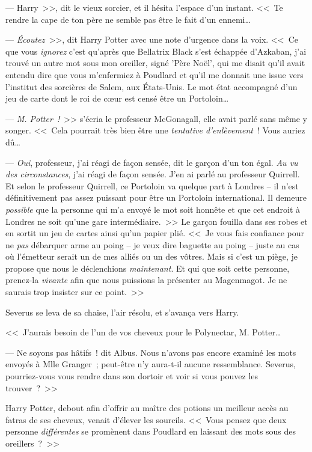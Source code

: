 --- Harry~>>, dit le vieux sorcier, et il hésita l'espace d'un instant. <<~Te rendre la cape de ton père ne semble pas être le fait d'un ennemi…

--- \emph{Écoutez}~>>, dit Harry Potter avec une note d'urgence dans la voix. <<~Ce que vous \emph{ignorez} c'est qu'après que Bellatrix Black s'est échappée d'Azkaban, j'ai trouvé un autre mot sous mon oreiller, signé 'Père Noël', qui me disait qu'il avait entendu dire que vous m'enfermiez à Poudlard et qu'il me donnait une issue vers l'institut des sorcières de Salem, aux États-Unis. Le mot état accompagné d'un jeu de carte dont le roi de cœur est censé être un Portoloin…

--- \emph{M. Potter~!}~>> s'écria le professeur McGonagall, elle avait parlé sans même y songer. <<~Cela pourrait très bien être une \emph{tentative d'enlèvement}~! Vous auriez dû…

--- \emph{Oui}, professeur, j'ai réagi de façon sensée, dit le garçon d'un ton égal. \emph{Au vu des circonstances}, j'ai réagi de façon sensée. J'en ai parlé au professeur Quirrell. Et selon le professeur Quirrell, ce Portoloin va quelque part à Londres -- il n'est définitivement pas assez puissant pour être un Portoloin international. Il demeure \emph{possible} que la personne qui m'a envoyé le mot soit honnête et que cet endroit à Londres ne soit qu'une gare intermédiaire.~>> Le garçon fouilla dans ses robes et en sortit un jeu de cartes ainsi qu'un papier plié. <<~Je vous fais confiance pour ne \emph{pas} débarquer arme au poing -- je veux dire baguette au poing -- juste au cas où l'émetteur serait un de mes alliés ou un des vôtres. Mais si c'est un piège, je propose que nous le déclenchions \emph{maintenant}. Et qui que soit cette personne, prenez-la \emph{vivante} afin que nous puissions la présenter au Magenmagot. Je ne saurais trop insister sur ce point.~>>

Severus se leva de sa chaise, l'air résolu, et s'avança vers Harry.

<<~J'aurais besoin de l'un de vos cheveux pour le Polynectar, M. Potter…

--- Ne soyons pas hâtifs~! dit Albus. Nous n'avons pas encore examiné les mots envoyés à Mlle Granger~; peut-être n'y aura-t-il aucune ressemblance. Severus, pourriez-vous vous rendre dans son dortoir et voir si vous pouvez les trouver~?~>>

Harry Potter, debout afin d'offrir au maître des potions un meilleur accès au fatras de ses cheveux, venait d'élever les sourcils. <<~Vous pensez que deux personne \emph{différentes} se promènent dans Poudlard en laissant des mots sous des oreillers~?~>>

